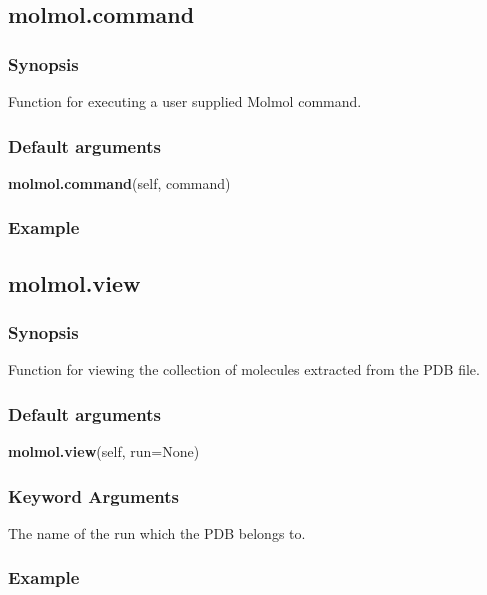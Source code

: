 \subsection{molmol.command}


\subsubsection{Synopsis}

Function for executing a user supplied Molmol command.

\subsubsection{Default arguments}

\textsf{\textbf{molmol.command}(self, command)}


\subsubsection{Example}




\newpage

\subsection{molmol.view}


\subsubsection{Synopsis}

Function for viewing the collection of molecules extracted from the PDB file.

\subsubsection{Default arguments}

\textsf{\textbf{molmol.view}(self, run=None)}


\subsubsection{Keyword Arguments}

  The name of the run which the PDB belongs to.

\subsubsection{Example}

